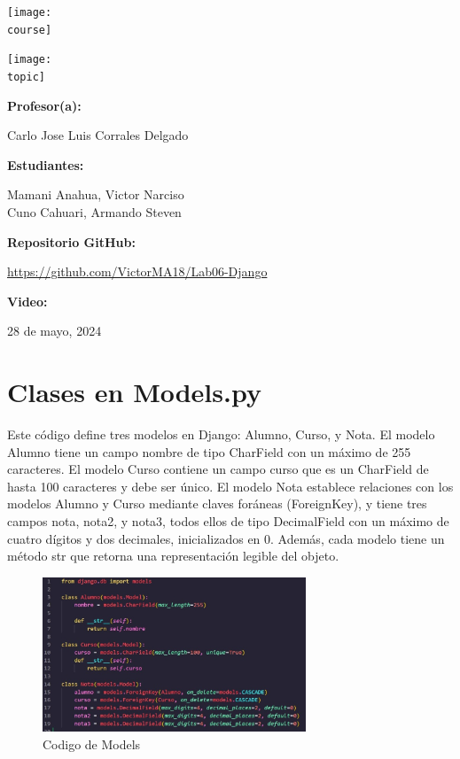 \documentclass[10pt, a4paper]{article}
\newcommand{\course}{img/web_programming}
\newcommand{\topic}{img/Django.jpg}
\newcommand{\professor}{Carlo Jose Luis Corrales Delgado}
\newcommand{\students}{Mamani Anahua, Victor Narciso \\ Cuno Cahuari, Armando Steven}
\newcommand{\github}{https://github.com/VictorMA18/Lab06-Django}
\newcommand{\video}{}
\newcommand{\mydate}{28 de mayo, 2024}
\begin{document}
\begin{titlepage}
	\centering
	\texttt{[image: \\course]} \par
  \vfill \vfill
	\texttt{[image: \\topic]}\par
  \vfill \vfill
  {\textbf{Profesor(a):} \par}
	\professor \vfill
  {\textbf{Estudiantes:} \par}
	\students \vfill
  {\textbf{Repositorio GitHub:} \par}
  \href{\github}{\github} \vfill
  {\textbf{Video:} \par}
  \href{\video}{\video} \vfill
	{\large \mydate \par}
\end{titlepage}

\section{Clases en Models.py}
Este código define tres modelos en Django: Alumno, Curso, y Nota. El modelo Alumno tiene un campo nombre de tipo CharField con un máximo de 255 caracteres. El modelo Curso contiene un campo curso que es un CharField de hasta 100 caracteres y debe ser único. El modelo Nota establece relaciones con los modelos Alumno y Curso mediante claves foráneas (ForeignKey), y tiene tres campos nota, nota2, y nota3, todos ellos de tipo DecimalField con un máximo de cuatro dígitos y dos decimales, inicializados en 0. Además, cada modelo tiene un método str que retorna una representación legible del objeto.
\begin{figure}[H]
  \centering
  \includegraphics[width=0.7\textwidth]{img/imagen1.jpeg}
  \caption{Codigo de Models}
\end{figure} 
\end{document}
